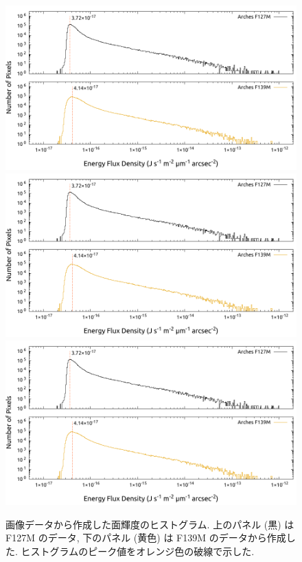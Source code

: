 \documentclass[10pt,a4paper,dvipdfmx,uplatex]{jsarticle}
\begin{document}
\begin{figure}
  \centering
  \includegraphics[page=1,width=.9\linewidth]{img/histogram.pdf}
  \includegraphics[page=2,width=.9\linewidth]{img/histogram.pdf}
  \includegraphics[page=3,width=.9\linewidth]{img/histogram.pdf}
  \caption{画像データから作成した面輝度のヒストグラム. 上のパネル (黒) は F127M のデータ, 下のパネル (黄色) は F139M のデータから作成した. ヒストグラムのピーク値をオレンジ色の破線で示した.}
  \label{fig:histogram:1}
\end{figure}
\end{document}
